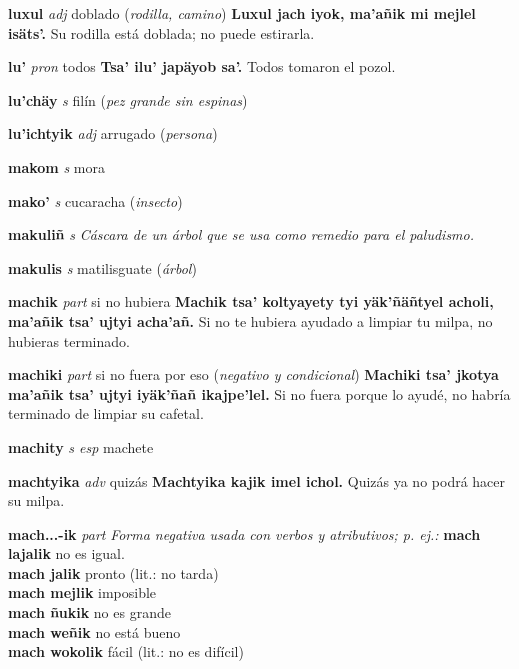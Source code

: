 \documentclass[10pt]{scrbook}
\newcommand{\entry}[1]{\textbf{#1}}
\newcommand{\alphaletter}[1]{\end{multicols}\addsec{#1}\begin{multicols}{2}}
\newcommand{\nontranslationdef}[1]{\textit{#1}}
\newcommand{\partofspeech}[1]{\textit{#1}}
\newcommand{\spanishtranslation}[1]{#1}
\newcommand{\clarification}[1]{(\textit{#1})}
\newcommand{\cholexample}[1]{\textbf{#1}}
\newcommand{\exampletranslation}[1]{#1}
\newcommand{\secondaryentry}[1]{\\\textbf{#1}}
\newcommand{\secondtranslation}[1]{#1}
\begin{document}
\begin{multicols}{2}
\entry{luxul}
\partofspeech{adj}
\spanishtranslation{doblado}
\clarification{rodilla, camino}
\cholexample{Luxul jach iyok, ma'añik mi mejlel isäts'.}
\exampletranslation{Su rodilla está doblada; no puede estirarla.}

\entry{lu'}
\partofspeech{pron}
\spanishtranslation{todos}
\cholexample{Tsa' ilu' japäyob sa'.}
\exampletranslation{Todos tomaron el pozol.}

\entry{lu'chäy}
\partofspeech{s}
\spanishtranslation{filín}
\clarification{pez grande sin espinas}

\entry{lu'ichtyik}
\partofspeech{adj}
\spanishtranslation{arrugado}
\clarification{persona}

\alphaletter{M}

\entry{makom}
\partofspeech{s}
\spanishtranslation{mora}

\entry{mako'}
\partofspeech{s}
\spanishtranslation{cucaracha}
\clarification{insecto}

\entry{makuliñ}
\partofspeech{s}
\nontranslationdef{Cáscara de un árbol que se usa como remedio para el paludismo.}

\entry{makulis}
\partofspeech{s}
\spanishtranslation{matilisguate}
\clarification{árbol}

\entry{machik}
\partofspeech{part}
\spanishtranslation{si no hubiera}
\cholexample{Machik tsa' koltyayety tyi yäk'ñäñtyel acholi, ma'añik tsa' ujtyi acha'añ.}
\exampletranslation{Si no te hubiera ayudado a limpiar tu milpa, no hubieras terminado.}

\entry{machiki}
\partofspeech{part}
\spanishtranslation{si no fuera por eso}
\clarification{negativo y condicional}
\cholexample{Machiki tsa' jkotya ma'añik tsa' ujtyi iyäk'ñañ ikajpe'lel.}
\exampletranslation{Si no fuera porque lo ayudé, no habría terminado de limpiar su cafetal.}

\entry{machity}
\partofspeech{s esp}
\spanishtranslation{machete}

\entry{machtyika}
\partofspeech{adv}
\spanishtranslation{quizás}
\cholexample{Machtyika kajik imel ichol.}
\exampletranslation{Quizás ya no podrá hacer su milpa.}

\entry{mach...-ik}
\partofspeech{part}
\nontranslationdef{Forma negativa usada con verbos y atributivos; p. ej.:}
\cholexample{mach lajalik}
\exampletranslation{no es igual.}
\secondaryentry{mach jalik}
\secondtranslation{pronto (lit.: no tarda)}
\secondaryentry{mach mejlik}
\secondtranslation{imposible}
\secondaryentry{mach ñukik}
\secondtranslation{no es grande}
\secondaryentry{mach weñik}
\secondtranslation{no está bueno}
\secondaryentry{mach wokolik}
\secondtranslation{fácil (lit.: no es difícil)}


\end{multicols}
\end{document}
